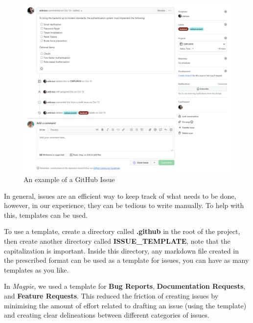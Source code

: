 \begin{figure}[htbp]
    \centering{}
    \includegraphics[width=\textwidth]{images/github_issue.png}
    \caption{An example of a GitHub Issue}
\end{figure}

\newpage{}

In general, issues are an efficient way to keep track of what needs to be done,
however, in our experience, they can be tedious to write manually. To help with
this, templates can be used.

To use a template, create a directory called \textbf{.github} in the root of the
project, then create another directory called \textbf{ISSUE\_TEMPLATE}, note
that the capitalization is important. Inside this directory, any markdown file
created in the prescribed format can be used as a template for issues, you can
have as many templates as you like.

In \textit{Magpie}, we used a template for \textbf{Bug Reports},
\textbf{Documentation Requests}, and \textbf{Feature Requests}. This reduced the
friction of creating issues by minimising the amount of effort related to
drafting an issue (using the template) and creating clear delineations between
different categories of issues.

